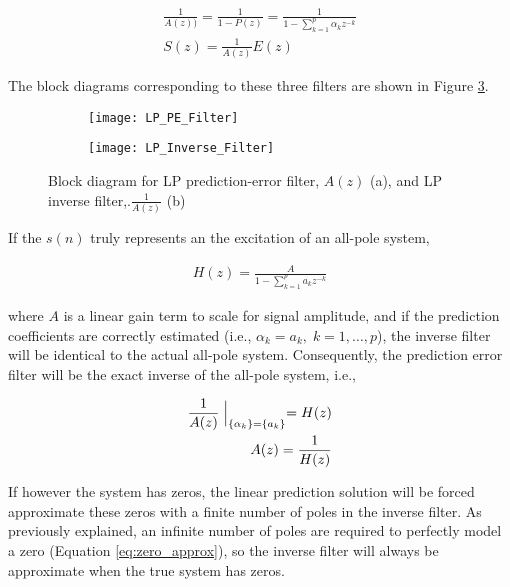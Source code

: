 \begin{eqnarray}
	\frac{1}{A(z))} = \frac{1}{1 - P(z)} = \frac{1}{1 - \sum_{k=1}^{p}\alpha_k z^{-k}} \\
	S(z) = \frac{1}{A(z)} E(z)
\end{eqnarray}

The block diagrams corresponding to these three filters are shown in Figure \ref{fig:LP_Filters}.

\begin{figure}[H]
	\centering
	\begin{subfigure}[b]{0.49\textwidth}
		\centering
		\texttt{[image: LP\_PE\_Filter]}
		\subcaption{} \label{subfig:lp_pe_filter}
	\end{subfigure}
	\hfill
	\begin{subfigure}[b]{0.49\textwidth}
		\centering
		\texttt{[image: LP\_Inverse\_Filter]}
		\subcaption{} \label{subfig:lp_inverse_filter}
	\end{subfigure}
	\caption[Block diagrams for filtering perspective of linear prediction]{Block diagram for LP prediction-error filter, $A(z)$ (a), and LP inverse filter,.$\frac{1}{A(z)}$ (b)}
	\label{fig:LP_Filters}
\end{figure}

If the $s(n)$ truly represents an the excitation of an all-pole system,  

\begin{eqnarray}
	H(z) = \frac{A}{1 - \sum_{k=1}^{p}a_k z^{-k}}
\end{eqnarray}

\noindent
where $A$ is a linear gain term to scale for signal amplitude, and if the prediction coefficients are correctly estimated (i.e., $\alpha_k=a_k, \; k=1,\dots,p$), the inverse filter will be identical to the actual all-pole system. Consequently, the prediction error filter will be the exact inverse of the all-pole system, i.e.,

\begin{eqnarray}
	\frac{1}{A(z)}\Bigm|_{\{\alpha_k\}=\{a_k\}}=H(z) \\
	A(z)=\frac{1}{H(z)}
\end{eqnarray}

If however the system has zeros, the linear prediction solution will be forced approximate these zeros with a finite number of poles in the inverse filter. As previously explained, an infinite number of poles are required to perfectly model a zero (Equation \ref{eq:zero_approx}), so the inverse filter will always be approximate when the true system has zeros.

